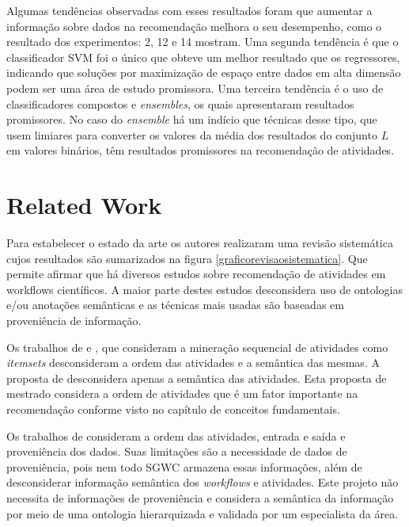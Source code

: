 \documentclass[10pt]{article}
\begin{document}
Algumas tendências observadas com esses resultados foram que aumentar a informação sobre dados na recomendação melhora o seu desempenho, como o resultado dos experimentos: 2, 12 e 14 mostram. Uma segunda tendência é que o classificador SVM foi o único que obteve um melhor resultado que os regressores, indicando que soluções por maximização de espaço entre dados em alta dimensão podem ser uma área de estudo promissora. Uma terceira tendência é o uso de classificadores compostos e \emph{ensembles}, os quais apresentaram resultados promissores. No caso do \emph{ensemble} há um indício que técnicas desse tipo, que usem limiares para converter os valores da média dos resultados do conjunto \(L\) em valores binários, têm resultados promissores na recomendação de atividades.


\section*{Related Work} \label{sec:rw}
Para estabelecer o estado da arte os autores realizaram uma revisão sistemática \cite{Biochini} cujos resultados são sumarizados na figura \ref{graficorevisaosistematica}. Que permite afirmar que há diversos estudos sobre recomendação de atividades em workflows científicos. A maior parte destes estudos desconsidera uso de ontologias e/ou anotações semânticas e as técnicas mais usadas são baseadas em proveniência de informação.

Os trabalhos de  e , que consideram a mineração sequencial de atividades como \emph{itemsets} desconsideram a ordem das atividades e a semântica das mesmas. A proposta de  desconsidera apenas a semântica das atividades. Esta proposta de mestrado considera a ordem de atividades que é um fator importante na recomendação conforme visto no capítulo de conceitos fundamentais.

Os trabalhos de  consideram a ordem das atividades, entrada e saída e proveniência dos dados. Suas limitações são a necessidade de dados de proveniência, pois nem todo SGWC armazena essas informações, além de desconsiderar informação semântica dos \emph{workflows} e atividades. Este projeto não necessita de informações de proveniência e considera a semântica da informação por meio de uma ontologia hierarquizada e validada por um especialista da área.
\end{document}
